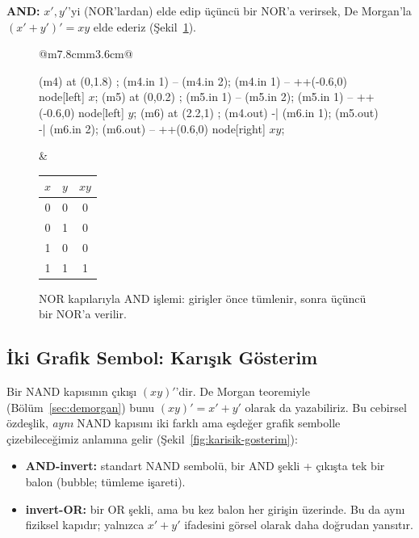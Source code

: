 \textbf{AND:} $x',y'$'yi (NOR'lardan) elde edip üçüncü bir NOR'a verirsek, De Morgan'la
$(x'+y')'=xy$ elde ederiz (Şekil~\ref{fig:nor-and}).

\begin{figure}[H]
\centering
\begin{tabular}{@{}m{7.8cm}m{3.6cm}@{}}
\begin{circuitikz}[scale=1.3, font=\normalsize]
\node[nor port, number inputs=2] (m4) at (0,1.8) {};
\draw (m4.in 1) -- (m4.in 2);
\draw (m4.in 1) -- ++(-0.6,0) node[left] {$x$};
\node[nor port, number inputs=2] (m5) at (0,0.2) {};
\draw (m5.in 1) -- (m5.in 2);
\draw (m5.in 1) -- ++(-0.6,0) node[left] {$y$};
\node[nor port, number inputs=2] (m6) at (2.2,1) {};
\draw (m4.out) -| (m6.in 1);
\draw (m5.out) -| (m6.in 2);
\draw (m6.out) -- ++(0.6,0) node[right] {$xy$};
\end{circuitikz}
&
\begin{tabular}{cc|c}
\toprule
$x$&$y$&$xy$\\
\midrule
0&0&0\\0&1&0\\1&0&0\\1&1&1\\
\bottomrule
\end{tabular}
\end{tabular}
\caption{NOR kapılarıyla AND işlemi: girişler önce tümlenir, sonra üçüncü bir NOR'a
verilir.}
\label{fig:nor-and}
\end{figure}

\subsection{İki Grafik Sembol: Karışık Gösterim}\label{sec:nandnor-karisik-gosterim}
Bir NAND kapısının çıkışı $(xy)'$'dir. De Morgan teoremiyle (Bölüm~\ref{sec:demorgan})
bunu $(xy)'=x'+y'$ olarak da yazabiliriz. Bu cebirsel özdeşlik, \emph{aynı} NAND kapısını
iki farklı ama eşdeğer grafik sembolle çizebileceğimiz anlamına gelir
(Şekil~\ref{fig:karisik-gosterim}):
\begin{itemize}[nosep, leftmargin=*]
    \item \textbf{AND-invert:} standart NAND sembolü, bir AND şekli + çıkışta tek bir
    balon (bubble; tümleme işareti).
    \item \textbf{invert-OR:} bir OR şekli, ama bu kez balon her girişin üzerinde. Bu da
    aynı fiziksel kapıdır; yalnızca $x'+y'$ ifadesini görsel olarak daha doğrudan yansıtır.
\end{itemize}

